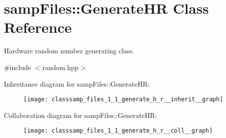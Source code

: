 \hypertarget{classsamp_files_1_1_generate_h_r}{}\section{samp\+Files\+:\+:Generate\+HR Class Reference}
\label{classsamp_files_1_1_generate_h_r}


Hardware random number generating class.  




{\ttfamily \#include $<$random.\+hpp$>$}



Inheritance diagram for samp\+Files\+:\+:Generate\+HR\+:\nopagebreak
\begin{figure}[H]
\begin{center}
\leavevmode
\texttt{[image: classsamp\_files\_1\_1\_generate\_h\_r\_\_inherit\_\_graph]}
\end{center}
\end{figure}


Collaboration diagram for samp\+Files\+:\+:Generate\+HR\+:\nopagebreak
\begin{figure}[H]
\begin{center}
\leavevmode
\texttt{[image: classsamp\_files\_1\_1\_generate\_h\_r\_\_coll\_\_graph]}
\end{center}
\end{figure}
